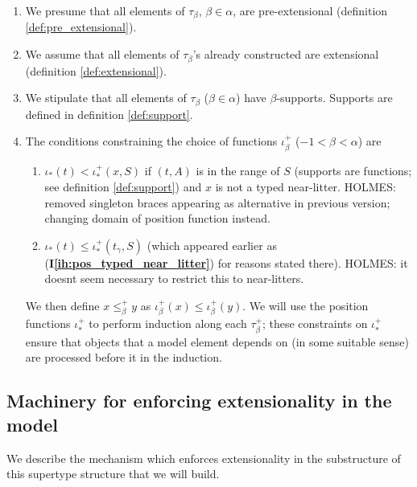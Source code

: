 \documentclass[112pt]{article}
\theoremstyle{definition}
\theoremstyle{remark}
\newcommand{\ihref}[1]{(\textbf{I\ref{#1}})}
\newcommand{\hsuggest}[1]{{\color{magenta}#1}}
\begin{document}
\begin{enumerate}
\item \label{ih:pre_extensional} We presume that all elements of $\tau_\beta$, $\beta\in \alpha$, are pre-extensional {(definition \ref{def:pre_extensional})}.   %

\item \label{ih:extensional} We assume that all elements of $\tau_\beta$'s already constructed are extensional {(definition \ref{def:extensional})}.  %

\item \label{ih:elements_have_supports} We stipulate that all elements of $\tau_\beta$ ($\beta\in\alpha$) have $\beta$-supports.  {Supports are defined in definition \ref{def:support}.}

\item \label{ih:position_constraints} The conditions constraining the choice of functions $\iota^+_\beta$ ($-1 < \beta < \alpha$) are

\begin{enumerate}

\item $\iota_*(t) < \iota^+_*(x,S)$ if $(t,A)$ is in the range of $S$ {(supports are functions; see definition \ref{def:support})} and $x$ is not a typed near-litter.  \hsuggest{HOLMES:  removed singleton braces appearing as alternative in previous version;  changing domain of position function instead.}

\item $\iota_*(t) \leq \iota^+_*(t_\gamma,S)$ {(which appeared earlier as \ihref{ih:pos_typed_near_litter} for reasons stated there).}  \hsuggest{HOLMES:  it doesnt seem necessary to restrict this to near-litters.}

\end{enumerate}

We then define $x \leq^+_\beta y$ as $\iota^+_\beta(x) \leq \iota^+_\beta(y)$.  {We will use the position functions $\iota^+_*$ to perform induction along each $\tau_\beta^+$; these constraints on $\iota^+_*$ ensure that objects that a model element depends on (in some suitable sense) are processed before it in the induction.}

\end{enumerate}


\subsection{Machinery for enforcing extensionality in the model}\label{ss:extensionality_machinery}
  We describe the mechanism which enforces extensionality in the substructure of this supertype structure that we will build.
\end{document}
